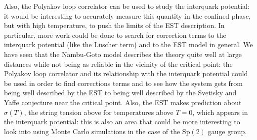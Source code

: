 \documentclass[reqno,12pt]{article}
\numberwithin{equation}{section}
\newcommand{\Sp}{\mathrm{Sp}}
\begin{document}
Also, the Polyakov loop correlator can be used to study the interquark potential: it would be interesting to accurately measure
this quantity in the confined phase, but with high temperature, to push the limits of the EST description. 
In particular, more work could be done to search for correction
terms to the interquark potential (like the L{\"u}scher term) and to the EST model in general. We have seen that the
Nambu-Goto model describes the theory quite well at large distances while not being as reliable in the vicinity
of the critical point: the Polyakov loop correlator and its relationship with the interquark potential could be used
in order to find corrections terms and to see how the system gets from being well described by the EST to being well
described by the Svetisky and Yaffe conjecture near the critical point.
Also, the EST makes prediction about $\sigma(T)$, the string tension
above for temperatures above $T = 0$, which appears in the interquark potential: 
this is also an area that could be more interesting to look into using Monte
Carlo simulations in the case of the $\Sp(2)$ gauge group.


\newpage
\end{document}

